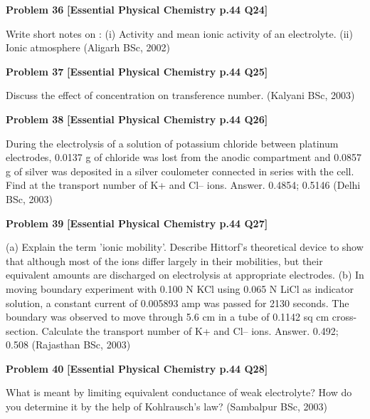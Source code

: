 \begin{problembox}
\textbf{Problem 36} \hfill \textbf{[Essential Physical Chemistry p.44 Q24]}
\label{q:ext-essential_all_questions-36}

Write short notes on :
(i)
Activity and mean ionic activity of an electrolyte.
(ii)
Ionic atmosphere
(Aligarh BSc, 2002)
\end{problembox}

\begin{problembox}
\textbf{Problem 37} \hfill \textbf{[Essential Physical Chemistry p.44 Q25]}
\label{q:ext-essential_all_questions-37}

Discuss the effect of concentration on transference number.
(Kalyani BSc, 2003)
\end{problembox}

\begin{problembox}
\textbf{Problem 38} \hfill \textbf{[Essential Physical Chemistry p.44 Q26]}
\label{q:ext-essential_all_questions-38}

During the electrolysis of a solution of potassium chloride between platinum electrodes, 0.0137 g of
chloride was lost from the anodic compartment and 0.0857 g of silver was deposited in a silver
coulometer connected in series with the cell. Find at the transport number of K+ and Cl-- ions.
Answer. 0.4854; 0.5146
(Delhi BSc, 2003)
\end{problembox}

\begin{problembox}
\textbf{Problem 39} \hfill \textbf{[Essential Physical Chemistry p.44 Q27]}
\label{q:ext-essential_all_questions-39}

(a)
Explain the term 'ionic mobility'. Describe Hittorf's theoretical device to show that although most
of the ions differ largely in their mobilities, but their equivalent amounts are discharged on electrolysis
at appropriate electrodes.
(b)
In moving boundary experiment with 0.100 N KCl using 0.065 N LiCl as indicator solution, a
constant current of 0.005893 amp was passed for 2130 seconds. The boundary was observed to
move through 5.6 cm in a tube of 0.1142 sq cm cross-section. Calculate the transport number of
K+ and Cl-- ions.
Answer. 0.492; 0.508
(Rajasthan BSc, 2003)
\end{problembox}

\begin{problembox}
\textbf{Problem 40} \hfill \textbf{[Essential Physical Chemistry p.44 Q28]}
\label{q:ext-essential_all_questions-40}

What is meant by limiting equivalent conductance of weak electrolyte? How do you determine it by the
help of Kohlrausch's law?
(Sambalpur BSc, 2003)
\end{problembox}

